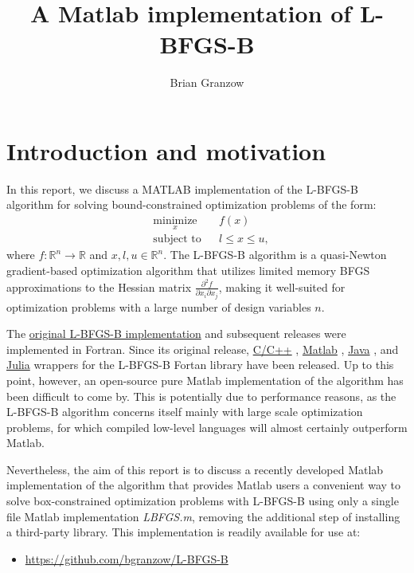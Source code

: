 \documentclass[11pt]{article}
\title{A Matlab implementation of L-BFGS-B}
\author{Brian Granzow}
\date{}
\begin{document}
\maketitle

\section{Introduction and motivation}
In this report, we discuss a MATLAB implementation of
the L-BFGS-B \cite{lbfgsb} algorithm for solving
bound-constrained optimization problems of the form:
%
\begin{equation}
\begin{aligned}
& \underset{x}{\text{minimize}}
& & f(x) \\
& \text{subject to}
& & l \leq x \leq u,
\end{aligned}
\end{equation}
%
where $f: \mathbb{R}^n \to \mathbb{R}$ and $x,l,u \in \mathbb{R}^n$.
The L-BFGS-B algorithm is a quasi-Newton gradient-based
optimization algorithm that utilizes limited memory
BFGS approximations to the Hessian matrix
$\frac{\partial^2 f}{\partial x_i \partial x_j}$, making
it well-suited for optimization problems with a large
number of design variables $n$.

The \href{http://users.iems.northwestern.edu/~nocedal/lbfgsb.html}
{original L-BFGS-B implementation}  \cite{lbfgsb3}
and subsequent releases were implemented in Fortran.
Since its original release,
\href{https://github.com/stephenbeckr/L-BFGS-B-C}{C/C++}
\cite{C},
\href{https://github.com/pcarbo/lbfgsb-matlab}{Matlab}
\cite{Matlab},
\href{https://github.com/mkobos/lbfgsb_wrapper}{Java}
\cite{Java},
and \href{https://github.com/yuhonglin/Lbfgsb.jl}{Julia}
\cite{Julia}
wrappers for the L-BFGS-B Fortan library have been released.
Up to this point, however, an open-source pure Matlab
implementation of the algorithm has been difficult to
come by. This is potentially due to performance reasons,
as the L-BFGS-B algorithm concerns itself mainly with large
scale optimization problems, for which compiled low-level
languages will almost certainly outperform Matlab.

Nevertheless, the aim of this report is to discuss a
recently developed Matlab implementation of the algorithm
that provides Matlab users a convenient way to solve
box-constrained optimization problems with L-BFGS-B using
only a single file Matlab implementation \emph{LBFGS.m},
removing the additional step of installing a third-party
library. This implementation is readily available for use at:
\begin{itemize}
\item \url{https://github.com/bgranzow/L-BFGS-B}{}
\end{itemize}
\end{document}
